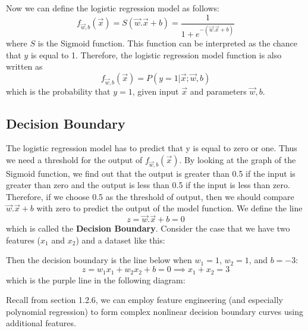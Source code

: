 \documentclass[a4paper, 12pt]{book}
\begin{document}
Now we can define the logistic regression model as follows: \[f_{\Vec{w},b}(\Vec{x}) = S(\Vec{w}.\Vec{x}+b) = \frac{1}{1+e^{-(\Vec{w}.\Vec{x}+b)}}\] where $S$ is the Sigmoid function. This function can be interpreted as the chance that $y$ is equal to 1. Therefore, the logistic regression model function is also written as \[f_{\Vec{w},b}(\Vec{x}) = P(y=1 | \Vec{x}; \Vec{w}, b)\] which is the probability that $y = 1$, given input $\Vec{x}$ and parameters $\Vec{w},b$.
\subsection{Decision Boundary}
The logistic regression model has to predict that y is equal to zero or one. Thus we need a threshold for the output of $f_{\Vec{w},b}(\Vec{x})$. By looking at the graph of the Sigmoid function, we find out that the output is greater than 0.5 if the input is greater than zero and the output is less than 0.5 if the input is less than zero. Therefore, if we choose 0.5 as the threshold of output, then we should compare $\Vec{w}.\Vec{x} + b$ with zero to predict the output of the model function. We define the line \[z = \Vec{w}.\Vec{x} + b = 0\] which is called the \textbf{Decision Boundary}. Consider the case that we have two features ($x_1$ and $x_2$) and a dataset like this:
\begin{center}
\end{center}
Then the decision boundary is the line below when $w_1 = 1$, $w_2 = 1$, and $b = -3$: \[z = w_1x_1 + w_2x_2 + b = 0 \implies x_1 + x_2 = 3\]
which is the purple line in the following diagram:
\begin{center}
\end{center}
Recall from section 1.2.6, we can employ feature engineering (and especially polynomial regression) to form complex nonlinear decision boundary curves using additional features.
\end{document}
